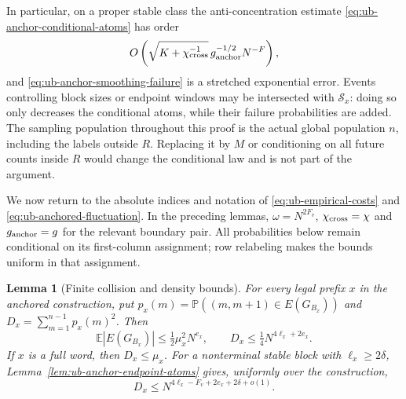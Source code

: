 \documentclass[11pt]{article}
\numberwithin{equation}{section}
\newtheorem{lemma}[lemma]{Lemma}
\newcommand{\E}{\mathbb E}
\newcommand{\Pp}{\mathbb P}
\newcommand{\1}{\mathbf 1}
\begin{document}
In particular, on a proper stable class the anti-concentration estimate
\eqref{eq:ub-anchor-conditional-atoms} has order
\[
 O\left(\sqrt{K+\chi_{\rm cross}^{-1}}\,
                  g_{\rm anchor}^{-1/2}N^{-F}\right),
\]
and \eqref{eq:ub-anchor-smoothing-failure} is a stretched exponential
error.  Events controlling block sizes or endpoint windows may be
intersected with $\mathcal S_x$: doing so only decreases the
conditional atoms, while their failure probabilities are added.
The sampling population throughout this proof is the actual global
population $n$, including the labels outside $R$.  Replacing it by
$M$ or conditioning on all future counts inside $R$ would change the
conditional law and is not part of the argument.

We now return to the absolute indices and notation of
\eqref{eq:ub-empirical-costs} and
\eqref{eq:ub-anchored-fluctuation}. In the preceding lemmas,
$\omega=N^{2F_v}$, $\chi_{\rm cross}=\chi$ and
$g_{\rm anchor}=g$ for the relevant boundary pair. All probabilities
below remain conditional on its first-column assignment; row
relabeling makes the bounds uniform in that assignment.

\begin{lemma}[Finite collision and density bounds]
\label{lem:ub-edge-density-bounds}
For every legal prefix $x$ in the anchored construction, put
$p_x(m)=\Pp((m,m+1)\in E(G_{B_x}))$ and
$D_x=\sum_{m=1}^{n-1}p_x(m)^2$. Then
\begin{equation}
\label{eq:ub-unconditional-prefix-density}
 \E|E(G_{B_x})|\le\tfrac12\mu_x^2N^{e_x},\qquad
 D_x\le\tfrac14N^{4\ell_x+2e_x}.
\end{equation}
If $x$ is a full word, then $D_x\le\mu_x$.
For a nonterminal stable block with $\ell_x\ge2\delta$, Lemma~\ref{lem:ub-anchor-endpoint-atoms} gives, uniformly over the construction,
\begin{equation}
\label{eq:ub-large-prefix-density}
 D_x\le N^{4\ell_x-F_v+2e_x+2\delta+o(1)}.
\end{equation}
\end{lemma}
\end{document}

